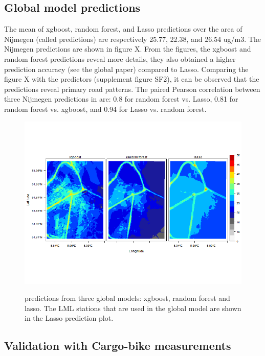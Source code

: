 \documentclass{article}
\begin{document}
 


\subsection{Global model predictions}
The mean of xgboost, random forest, and Lasso predictions over the area of Nijmegen (called predictions) are respectively 25.77, 22.38, and 26.54 ug/m3. The Nijmegen predictions are shown in figure X. From the figures, the xgboost and random forest predictions reveal more details, they also obtained a higher prediction accuracy (see the global paper) compared to Lasso. Comparing the figure X with the predictors (supplement figure SF2), it can be observed that the predictions reveal primary road patterns. The paired Pearson correlation between three Nijmegen predictions in are: 0.8 for random forest vs. Lasso, 0.81 for random forest vs. xgboost, and 0.94 for Lasso vs. random forest.
\begin{figure}[h!]
    \includegraphics[width=\linewidth]{f3.png}
    \label{seperate}
    \caption {predictions from three global models: xgboost, random forest and lasso. The LML stations that are used in the global model are shown in the Lasso prediction plot.}
\end{figure}
\subsection{Validation with Cargo-bike measurements}
\end{document}
